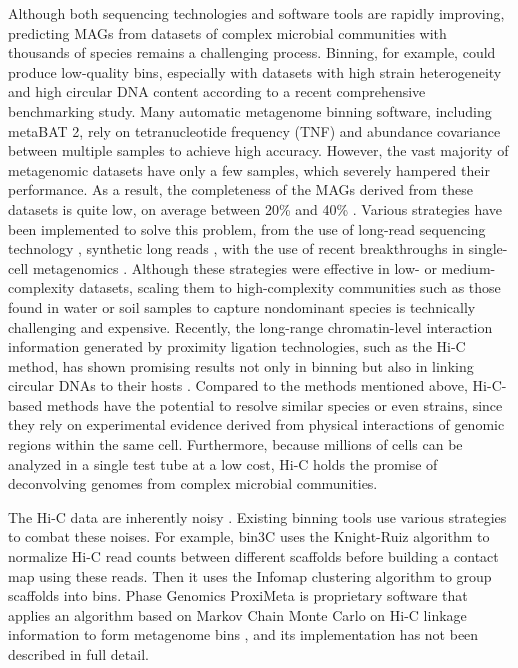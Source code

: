 \documentclass[fleqn,10pt,lineno]{wlpeerj}
\begin{document}
Although both sequencing technologies and software tools are rapidly improving, predicting MAGs from datasets of complex microbial communities with thousands of species remains a challenging process. Binning, for example, could produce low-quality bins, especially with datasets with high strain heterogeneity and high circular DNA content according to a recent comprehensive benchmarking study\citep{meyer2021critical}. Many automatic metagenome binning software, including metaBAT 2, rely on tetranucleotide frequency (TNF) and abundance covariance between multiple samples \citep{kang2019metabat} to achieve high accuracy. However, the vast majority of metagenomic datasets have only a few samples, which severely hampered their performance. As a result, the completeness of the MAGs derived from these datasets is quite low, on average between 20\% and 40\% \citep{meyer2021critical}. Various strategies have been implemented to solve this problem, from the use of long-read sequencing technology \citep{Bickhart2022GeneratingLC, Frank2016ImprovedMA}, synthetic long reads \citep{Chen2019SimpleAS}, 
with the use of recent breakthroughs in single-cell metagenomics \citep{Arikawa2021RecoveryOH, bowers2022dissecting}. Although these strategies were effective in low- or medium-complexity datasets, scaling them to high-complexity communities such as those found in water or soil samples to capture nondominant species is technically challenging and expensive. Recently, the long-range chromatin-level interaction information generated by proximity ligation technologies, such as the Hi-C method, has shown promising results not only in binning but also in linking circular DNAs to their hosts \citep{Burton2014SpeciesLevelDO, Beitel2014StrainAP, press2017hi}. Compared to the methods mentioned above, Hi-C-based methods have the potential to resolve similar species or even strains, since they rely on experimental evidence derived from physical interactions of genomic regions within the same cell. Furthermore, because millions of cells can be analyzed in a single test tube at a low cost, Hi-C holds the promise of deconvolving genomes from complex microbial communities.

The Hi-C data are inherently noisy \citep{Yaffe2011ProbabilisticMO}. Existing binning tools use various strategies to combat these noises. For example, bin3C uses the Knight-Ruiz algorithm to normalize Hi-C read counts between different scaffolds before building a contact map using these reads. Then it uses the Infomap clustering algorithm to group scaffolds into bins\citep{demaere2019bin3c}. Phase Genomics ProxiMeta is proprietary software that applies an algorithm based on Markov Chain Monte Carlo on Hi-C linkage information to form metagenome bins \citep{press2017hi}, and its implementation has not been described in full detail.
\end{document}
